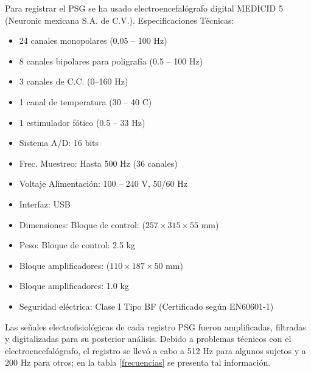 \documentclass[12pt,a4paper]{mitthesis}
\begin{document}
Para registrar el PSG se ha usado electroencefal\'ografo digital MEDICID 5 (Neuronic mexicana S.A. 
de C.V.). Especificaciones T\'ecnicas:
\begin{itemize}
\item 24 canales monopolares (0.05 -- 100 Hz)
\item 8 canales bipolares para poligraf\'ia (0.5 -- 100 Hz)
\item 3 canales de C.C. (0--160 Hz)
\item 1 canal de temperatura (30 -- 40 C)
\item 1 estimulador f\'otico (0.5 -- 33 Hz)
\item Sistema A/D: 16 bits
\item Frec. Muestreo: Hasta 500 Hz (36 canales)
\item Voltaje Alimentaci\'on: 100 -- 240 V, 50/60 Hz
\item Interfaz: USB
\item Dimensiones: Bloque de control: ($257 \times 315 \times 55$ mm)
\item Peso: Bloque de control: 2.5 kg
\item Bloque amplificadores: ($110\times 187\times 50$ mm)
\item Bloque amplificadores: 1.0 kg
\item Seguridad el\'ectrica: Clase I Tipo BF (Certificado según EN60601-1)
\end{itemize}

Las se\~nales electrofisiol\'ogicas de cada registro PSG fueron amplificadas, filtradas y 
digitalizadas para su posterior an\'alisis.
Debido a problemas t\'ecnicos con el electroencefal\'ografo, el registro se llev\'o a cabo
a 512 Hz para algunos sujetos y a 200 Hz para otros; en la tabla \ref{frecuencias} se presenta tal 
informaci\'on.
\end{document}
